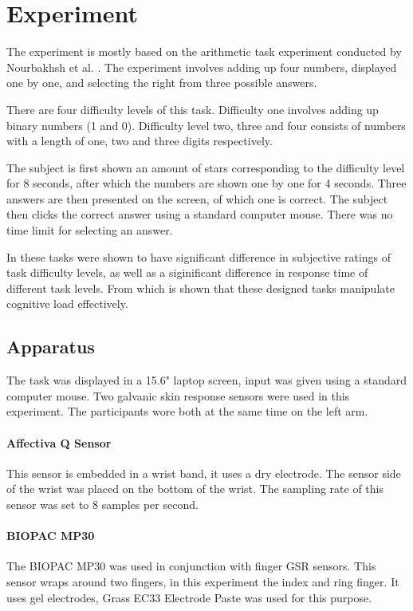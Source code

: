\documentclass[11pt,leqno,letterpaper]{report} %
\begin{document}
\section{Experiment}
The experiment is mostly based on the arithmetic task experiment conducted by Nourbakhsh et al. \citep{Nourbakhsh2012}. The experiment involves adding up four numbers, displayed one by one, and selecting the right from three possible answers.

There are four difficulty levels of this task. Difficulty one involves adding up binary numbers (1 and 0). Difficulty level two, three and four consists of numbers with a length of one, two and three digits respectively.

The subject is first shown an amount of stars corresponding to the difficulty level for 8 seconds, after which the numbers are shown one by one for 4 seconds. Three answers are then presented on the screen, of which one is correct. The subject then clicks the correct answer using a standard computer mouse. There was no time limit for selecting an answer.

In \citep{Nourbakhsh2013} these tasks were shown to have significant difference in subjective ratings of task difficulty levels, as well as a siginificant difference in response time of different task levels. From which is shown that these designed tasks manipulate cognitive load effectively.


\subsection{Apparatus}
The task was displayed in a 15.6" laptop screen, input was given using a standard computer mouse.
Two galvanic skin response sensors were used in this experiment. The participants wore both at the same time on the left arm.


\paragraph{Affectiva Q Sensor}
This sensor is embedded in a wrist band, it uses a dry electrode. The sensor side of the wrist was placed on the bottom of the wrist. The sampling rate of this sensor was set to 8 samples per second.

\paragraph{BIOPAC MP30}
The BIOPAC MP30 was used in conjunction with finger GSR sensors. This sensor wraps around two fingers, in this experiment the index and ring finger. It uses gel electrodes, Grass EC33 Electrode Paste was used for this purpose.
\end{document}
